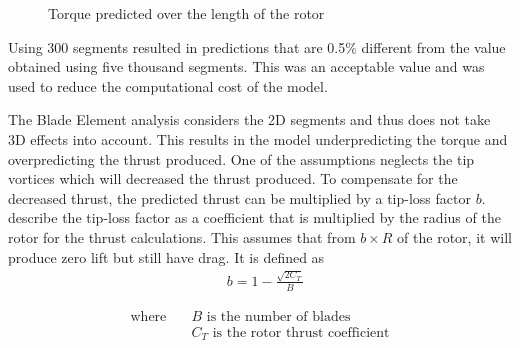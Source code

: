 \begin{figure}[h]
\begin{minipage}{0.45\textwidth}
                \caption{Torque predicted over the length of the rotor}
                \label{fig: torque_over_radius}
            \end{minipage}
        \end{figure}

        Using 300 segments resulted in predictions that are 0.5\% different from the value obtained using five thousand segments. This was an acceptable value and was used to reduce the computational cost of the model.

        The Blade Element analysis considers the 2D segments and thus does not take 3D effects into account. This results in the model underpredicting the torque and overpredicting the thrust produced. One of the assumptions neglects the tip vortices which will decreased the thrust produced. To compensate for the decreased thrust, the predicted thrust can be multiplied by a tip-loss factor \(b\). \cite{AflredAerodynamicsOfHelicopters} describe the tip-loss factor as a coefficient that is multiplied by the radius of the rotor for the thrust calculations. This assumes that from \(b\times R\) of the rotor, it will produce zero lift but still have drag. It is defined as 
            \begin{align}
                &b = 1 -\frac{\sqrt{2C_T}}{B}
            \end{align}
            \begin{minipage}{0.45\textwidth}
                \vspace*{-8mm}
                \begin{align*}
                    \text{where} \quad
                    &B  \text{ is the number of blades} \\
                    &C_T  \text{ is the rotor thrust coefficient}
                \end{align*}
                \end{minipage}
                \\
                
